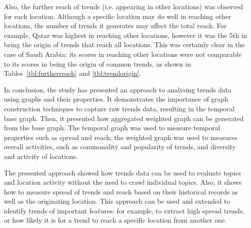 \documentclass{llncs}
\begin{document}
Also, the further reach of trends (i.e. appearing in other locations)
was observed for each location. Although a specific location may do
well in reaching other locations, the number of trends it generates may
affect the total reach. For example, Qatar was highest in reaching
other locations, however it was the 5th in being the origin of trends
that reach all locations. This was certainly clear in the case of Saudi
Arabia: its scores in reaching other locations were not comparable to its
scores in being the origin of common trends, as shown in
Tables~\ref{tbl:furtherreach} and \ref{tbl:trendorigin}.

In conclusion, the study has presented an approach to analysing trends data
using graphs and their properties. It demonstrates the importance of graph
construction techniques to capture raw trends data, resulting in the
temporal base graph. Then, it presented how aggregated weighted graph
can be generated from the base graph. The temporal graph was used to
measure temporal properties such as spread and reach; the weighted
graph was used to measures overall activities, such as commonality and
popularity of trends, and diversity and activity of locations.

The presented approach showed how trends data can be used to evaluate
topics and location activity without the need to crawl individual
topics. Also, it shows how to measure spread of trends and reach based
on their historical records as well as the originating location. This
approach can be used and extended to identify trends of important
features; for example, to extract high spread trends, or how likely it
is for a trend to reach a specific location from another one.






\end{document}
